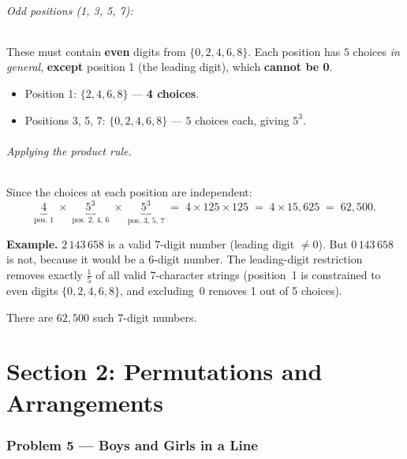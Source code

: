 \documentclass[12pt, a4paper]{article}
\begin{document}
\paragraph{Odd positions (1, 3, 5, 7):}
These must contain \textbf{even} digits from $\{0, 2, 4, 6, 8\}$.
Each position has $5$ choices \emph{in general}, \textbf{except}
position 1 (the leading digit), which \textbf{cannot be 0}.

\begin{itemize}[nosep]
  \item Position 1: $\{2, 4, 6, 8\}$ --- \textbf{4 choices}.
  \item Positions 3, 5, 7: $\{0, 2, 4, 6, 8\}$ --- $5$ choices each, giving $5^3$.
\end{itemize}

\paragraph{Applying the product rule.}
Since the choices at each position are independent:
\[
  \underbrace{4}_{\text{pos.\ 1}}
  \;\times\;
  \underbrace{5^3}_{\text{pos.\ 2, 4, 6}}
  \;\times\;
  \underbrace{5^3}_{\text{pos.\ 3, 5, 7}}
  \;=\; 4 \times 125 \times 125
  \;=\; 4 \times 15{,}625
  \;=\; 62{,}500.
\]

\textbf{Example.}\; $2\,143\,658$ is a valid 7-digit number (leading digit $\neq 0$). But $0\,143\,658$ is not, because it would be a 6-digit number. The leading-digit restriction removes exactly $\frac{1}{5}$ of all valid 7-character strings (position~1 is constrained to even digits $\{0,2,4,6,8\}$, and excluding~0 removes 1 out of 5 choices).

\begin{answerbox}
\centering
There are $\boxed{62{,}500}$ such 7-digit numbers.
\end{answerbox}

\newpage
\part*{Section 2: Permutations and Arrangements}

\section{Problem 5 --- Boys and Girls in a Line}
\end{document}
